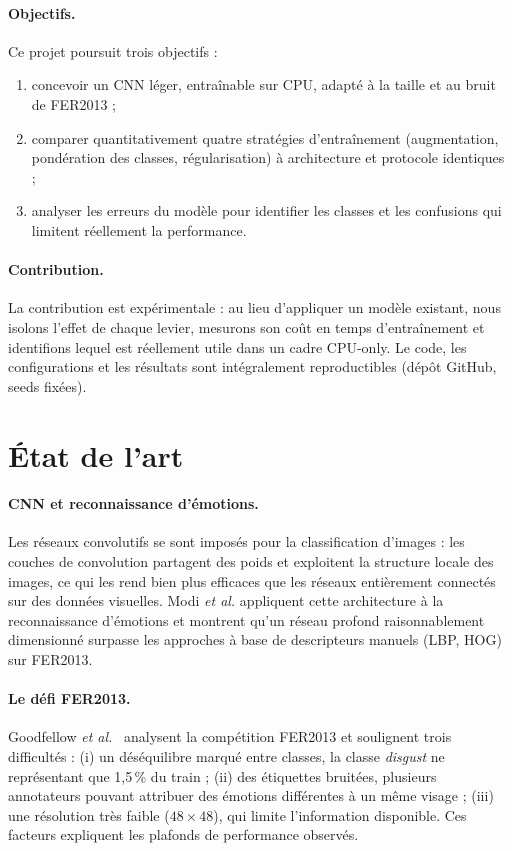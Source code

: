 \documentclass[11pt,a4paper]{article}
\begin{document}
\paragraph{Objectifs.}
Ce projet poursuit trois objectifs :
\begin{enumerate}
  \item concevoir un CNN léger, entraînable sur CPU, adapté à la taille et au
        bruit de FER2013 ;
  \item comparer quantitativement quatre stratégies d'entraînement
        (augmentation, pondération des classes, régularisation) à
        architecture et protocole identiques ;
  \item analyser les erreurs du modèle pour identifier les classes et les
        confusions qui limitent réellement la performance.
\end{enumerate}

\paragraph{Contribution.}
La contribution est expérimentale : au lieu d'appliquer un modèle existant,
nous isolons l'effet de chaque levier, mesurons son coût en temps
d'entraînement et identifions lequel est réellement utile dans un cadre
CPU-only. Le code, les configurations et les résultats sont intégralement
reproductibles (dépôt GitHub, seeds fixées).

\section{État de l'art}

\paragraph{CNN et reconnaissance d'émotions.}
Les réseaux convolutifs se sont imposés pour la classification d'images :
les couches de convolution partagent des poids et exploitent la structure
locale des images, ce qui les rend bien plus efficaces que les réseaux
entièrement connectés sur des données visuelles. Modi \emph{et al.}
\cite{modi} appliquent cette architecture à la reconnaissance d'émotions et
montrent qu'un réseau profond raisonnablement dimensionné surpasse les
approches à base de descripteurs manuels (LBP, HOG) sur FER2013.

\paragraph{Le défi FER2013.}
Goodfellow \emph{et al.}~\cite{goodfellow2013} analysent la compétition
FER2013 et soulignent trois difficultés : (i) un déséquilibre marqué entre
classes, la classe \emph{disgust} ne représentant que 1,5\,\% du train ;
(ii) des étiquettes bruitées, plusieurs annotateurs pouvant attribuer des
émotions différentes à un même visage ; (iii) une résolution très faible
($48\times48$), qui limite l'information disponible. Ces facteurs expliquent
les plafonds de performance observés.
\end{document}
